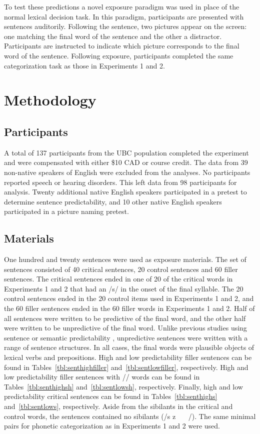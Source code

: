 To test these predictions a novel exposure paradigm was used in place of the normal lexical decision task.  
In this paradigm, participants are presented with sentences auditorily.  
Following the sentence, two pictures appear on the screen: one matching the final word of the sentence and the other a distractor. 
Participants are instructed to indicate which picture corresponds to the final word of the sentence.
Following exposure, participants completed the same categorization task as those in Experiments 1 and 2.

\section{Methodology}

\subsection{Participants}

A total of 137 participants from the UBC population completed the experiment and were compensated with either \$10 CAD or course credit.  
The data from 39 non-native speakers of English were excluded from the analyses.
No participants reported speech or hearing disorders.
This left data from 98 participants for analysis.
Twenty additional native English speakers participated in a pretest to determine sentence predictability, and 10 other native English speakers participated in a picture naming pretest.

\subsection{Materials}

One hundred and twenty sentences were used as exposure materials.  
The set of sentences consisted of 40 critical sentences, 20 control sentences and 60 filler sentences. 
The critical sentences ended in one of 20 of the critical words in Experiments 1 and 2 that had an /s/ in the onset of the final syllable.  
The 20 control sentences ended in the 20 control items used in Experiments 1 and 2, and the 60 filler sentences ended in the 60 filler words in Experiments 1 and 2.  
Half of all sentences were written to be predictive of the final word, and the other half were written to be unpredictive of the final word.  
Unlike previous studies using sentence or semantic predictability \citep{Kalikow1977}, unpredictive sentences were written with a range of sentence structures.
In all cases, the final words were plausible objects of lexical verbs and prepositions.
High and low predictability filler sentences can be found in Tables~\ref{tbl:senthighfiller} and~\ref{tbl:sentlowfiller}, respectively.
High and low predictability filler sentences with /\textesh/ words can be found in Tables~\ref{tbl:senthighsh} and~\ref{tbl:sentlowsh}, respectively.
Finally, high and low predictability critical sentences can be found in Tables~\ref{tbl:senthighs} and~\ref{tbl:sentlows}, respectively.
Aside from the sibilants in the critical and control words, the sentences contained no sibilants (/s z \textesh\ \textyogh\ \textteshlig\  \textdyoghlig/).  
The same minimal pairs for phonetic categorization as in Experiments 1 and 2 were used.

